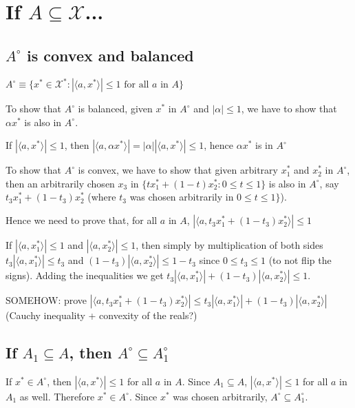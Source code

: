 \documentclass{article}
\begin{document}
\section{If $A \subseteq  \mathscr{X}$...}

\subsection{$A^{\circ}$ is convex and balanced}

$A^{\circ} \equiv \{x^*\in \mathscr{X}^*: | \langle a, x^*\rangle | \le 1 \text{ for all } a \text{ in } A\}$

To show that $A^{\circ}$ is balanced, given $x^*$ in $A^{\circ}$ and $|\alpha| \le 1$, we have to show that $\alpha x^*$ is also in $A^{\circ}$.

If $|\langle a, x^*\rangle | \le 1$, then $|\langle a, \alpha x^*\rangle | = |\alpha |  | \langle a, x^* \rangle | \le 1$, hence $\alpha x^*$ is in $A^{\circ}$

To show that $A^{\circ}$ is convex, we have to show that given arbitrary $x_1^*$ and $x_2^*$ in $A^{\circ}$, then an arbitrarily chosen $x_3$ in $\{t x_1^* + (1-t) x_2^* :0\le t \le 1\}$ is also in $A^{\circ}$, say $t_3 x_1^* + (1-t_3) x_2^*$ (where $t_3$ was chosen arbitrarily in $0\le t \le 1\}$).

Hence we need to prove that, for all $a$ in $A$, $|\langle a, t_3 x_1^* + (1-t_3) x_2^* \rangle | \le 1$

If $|\langle a, x_1^*\rangle | \le 1$ and $|\langle a, x_2^*\rangle | \le 1$, then simply by multiplication of both sides $t_3|\langle a, x_1^*\rangle | \le t_3$ and $(1-t_3)|\langle a, x_2^*\rangle | \le 1-t_3$ since $0 \le t_3 \le 1$ (to not flip the signs). Adding the inequalities we get $t_3|\langle a, x_1^*\rangle | +(1-t_3)|\langle a, x_2^*\rangle | \le 1$.

SOMEHOW: prove  $|\langle a, t_3 x_1^* + (1-t_3) x_2^* \rangle | \le t_3|\langle a, x_1^*\rangle | +(1-t_3)|\langle a, x_2^*\rangle |$ (Cauchy inequality + convexity of the reals?)

\subsection{If $A_1 \subseteq A$, then $A^{\circ} \subseteq A^{\circ}_1$}

If $x^* \in A^{\circ}$, then $| \langle a,x^* \rangle | \le 1$ for all $a$ in $A$. Since $A_1 \subseteq A$,  $| \langle a,x^* \rangle | \le 1$ for all $a$ in $A_1$ as well. Therefore $x^* \in A^{\circ}$. Since $x^*$ was chosen arbitrarily,  $A^{\circ} \subseteq A^{\circ}_1$.
\end{document}
